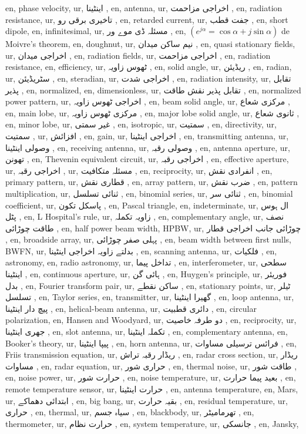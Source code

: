 en, phase velocity,
ur, اینٹینا ,
en, antenna,
ur, اخراجی مزاحمت ,
en, radiation resistance,
ur, تاخیری برقی رو ,
en, retarded current,
ur,  جفت قطب ,
en, short dipole,
en, infinitesimal,
ur, مسئلہ ڈی موے ور ,
en, $(e^{j\alpha }=\cos \alpha + j \sin \alpha )$ de Moivre's theorem,
en, doughnut,
ur, نیم ساکن میدان ,
en, quasi stationary fields,
ur, اخراجی میدان ,
en, radiation fields,
ur, اخراجی مزاحمت ,
en, radiation resistance,
en, efficiency,
ur, ٹھوس زاویہ ,
en, solid angle,
ur, ریڈیئن ,
en, radian,
ur, سٹریڈیئن ,
en, steradian,
ur, اخراجی شدت ,
en, radiation intensity,
ur, تقابل پذیر ,
en, normalized,
en, dimensionless,
ur, تقابل پذیر نقش طاقت ,
en, normalized power pattern,
ur, اخراجی ٹھوس زاویہ ,
en, beam solid angle,
ur, مرکزی شعاع ,
en, main lobe,
ur, مرکزی ٹھوس زاویہ ,
en, major lobe solid angle,
ur, ثانوی شعاع ,
en, minor lobe,
ur, غیر سمتی ,
en, isotropic,
ur, سمتیت ,
en, directivity,
ur, سمتیت ,
ur, افزائش ,
en, gain,
ur, اخراجی اینٹینا ,
en, transmitting antenna,
ur, وصولی اینٹینا ,
en, receiving antenna,
ur, وصولی رقبہ ,
en, antenna aperture,
ur, تھونن ,
en, Thevenin equivalent circuit,
ur, اخراجی رقبہ ,
en, effective aperture,
ur, اخراجی رقبہ ,
ur, مسئلہ متکافیت ,
en, reciprocity,
ur, انفرادی نقش ,
en, primary pattern,
ur, قطاری نقش ,
en, array pattern,
ur, ضرب نقش ,
en, pattern multiplication,
ur, ثنائی تسلسل ,
en, binomial series,
ur, ثنائی سر ,
en, binomial coefficient,
ur, پاسکل تکون ,
en, Pascal triangle,
en, indeterminate,
ur, ال ہوس پٹل ,
en, L Hospital's rule,
ur, زاویہ تکملہ ,
en, complementary angle,
ur, نصف طاقت چوڑائی ,
en, half power beam width, HPBW,
ur, چوڑائی جانب اخراجی قطار ,
en, broadside array,
ur, پہلی صفر چوڑائی ,
en, beam width between first nulls, BWFN,
ur, بدلتے زاویہ اخراجی اینٹینا ,
en, scanning antenna,
ur, فلکیات ,
en, astronomy,
en, radio astronomy,
ur, تداخل پیما ,
en, interferometer,
ur, سطحی اینٹینا ,
en, continuous aperture,
ur, ہائی گن ,
en, Huygen's principle,
ur, فوریئر بدل ,
en, Fourier transform pair,
ur, ساکن نقطے ,
en, stationary points,
ur, ٹیلر تسلسل ,
en, Taylor series,
en, transmitter,
ur, گھیرا اینٹینا ,
en, loop antenna,
ur, پیچ دار اینٹینا ,
en, helical-beam antenna,
ur, دائری قطبیت ,
en, circular polarization,
en, Hansen and Woodyard,
ur, دو طرفہ خاصیت ,
en, reciprocity,
ur, جھری اینٹینا ,
en, slot antenna,
ur, تکملہ اینٹینا ,
en, complementary antenna,
en, Booker's theory,
ur, پیپا اینٹینا ,
en, horn antenna,
ur, فرائس ترسیلی مساوات ,
en, Friis transmission equation,
ur, ریڈار رقبہ تراش ,
en, radar cross section,
ur, ریڈار مساوات ,
en, radar equation,
ur, حراری شور ,
en, thermal noise,
ur, طاقت شور ,
en, noise power,
ur, حرارت شور ,
en, noise temperature,
ur, بعید پیما حرارت ,
en, remote temperature sensor,
ur, حرارت اینٹینا ,
en, antenna temperature,
en, Mars,
ur, ابتدائی دھماکے ,
en, big bang,
ur, بقیہ حرارت ,
en, residual temperature,
ur, حراری ,
en, thermal,
ur, سیاہ جسم ,
en, blackbody,
ur, تھرمامیٹر ,
en, thermometer,
ur, حرارت نظام ,
en, system temperature,
ur, جانسکی ,
en, Jansky,
